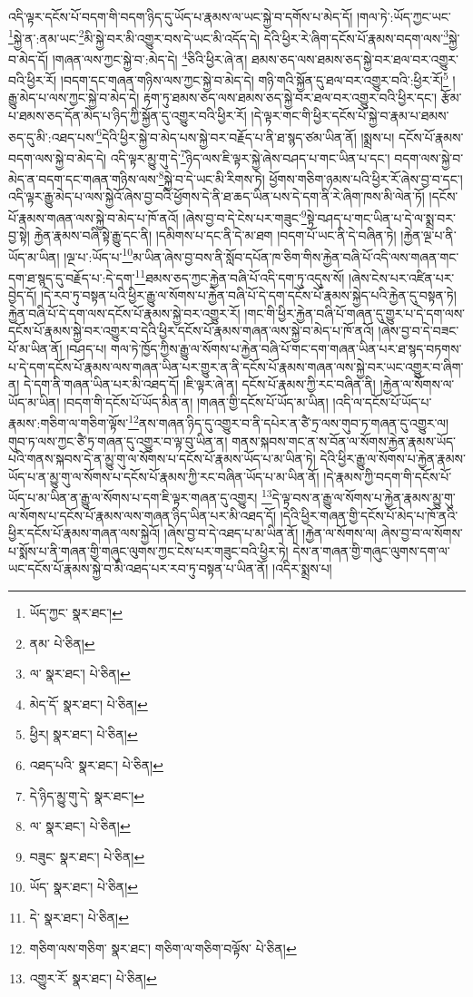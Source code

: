 འདི་ལྟར་དངོས་པོ་བདག་གི་བདག་ཉིད་དུ་ཡོད་པ་རྣམས་ལ་ཡང་སྐྱེ་བ་དགོས་པ་མེད་དོ། །གལ་ཏེ་:ཡོད་ཀྱང་ཡང་\footnote{ཡོད་ཀྱང་  སྣར་ཐང་། }སྐྱེ་ན་:ནམ་ཡང་\footnote{ནམ་  པེ་ཅིན། }མི་སྐྱེ་བར་མི་འགྱུར་བས་དེ་ཡང་མི་འདོད་དེ། དེའི་ཕྱིར་རེ་ཞིག་དངོས་པོ་རྣམས་བདག་ལས་\footnote{ལ་  སྣར་ཐང་།  པེ་ཅིན། }སྐྱེ་བ་མེད་དོ། །གཞན་ལས་ཀྱང་སྐྱེ་བ་:མེད་དེ། \footnote{མེད་དོ་  སྣར་ཐང་།  པེ་ཅིན། }ཅིའི་ཕྱིར་ཞེ་ན། ཐམས་ཅད་ལས་ཐམས་ཅད་སྐྱེ་བར་ཐལ་བར་འགྱུར་བའི་ཕྱིར་རོ། །བདག་དང་གཞན་གཉིས་ལས་ཀྱང་སྐྱེ་བ་མེད་དེ། གཉི་གའི་སྐྱོན་དུ་ཐལ་བར་འགྱུར་བའི་:ཕྱིར་རོ།\footnote{ཕྱིར།  སྣར་ཐང་།  པེ་ཅིན། } །རྒྱུ་མེད་པ་ལས་ཀྱང་སྐྱེ་བ་མེད་དེ། རྟག་ཏུ་ཐམས་ཅད་ལས་ཐམས་ཅད་སྐྱེ་བར་ཐལ་བར་འགྱུར་བའི་ཕྱིར་དང་། རྩོམ་པ་ཐམས་ཅད་དོན་མེད་པ་ཉིད་ཀྱི་སྐྱོན་དུ་འགྱུར་བའི་ཕྱིར་རོ། །དེ་ལྟར་གང་གི་ཕྱིར་དངོས་པོ་སྐྱེ་བ་རྣམ་པ་ཐམས་ཅད་དུ་མི་:འཐད་པས་\footnote{འཐད་པའི་  སྣར་ཐང་།  པེ་ཅིན། }དེའི་ཕྱིར་སྐྱེ་བ་མེད་པས་སྐྱེ་བར་བརྗོད་པ་ནི་ཐ་སྙད་ཙམ་ཡིན་ནོ། །སྨྲས་པ། དངོས་པོ་རྣམས་བདག་ལས་སྐྱེ་བ་མེད་དེ། འདི་ལྟར་མྱུ་གུ་དེ་\footnote{དེ་ཉིད་མྱུ་གུ་དེ་  སྣར་ཐང་། }ཉིད་ལས་ཇི་ལྟར་སྐྱེ་ཞེས་བཤད་པ་གང་ཡིན་པ་དང་། བདག་ལས་སྐྱེ་བ་མེད་ན་བདག་དང་གཞན་གཉིས་ལས་\footnote{ལ་  སྣར་ཐང་།  པེ་ཅིན། }སྐྱེ་བ་དེ་ཡང་མི་རིགས་ཏེ། ཕྱོགས་གཅིག་ཉམས་པའི་ཕྱིར་རོ་ཞེས་བྱ་བ་དང་། འདི་ལྟར་རྒྱུ་མེད་པ་ལས་སྐྱེའོ་ཞེས་བྱ་བའི་ཕྱོགས་དེ་ནི་ཐ་ཆད་ཡིན་པས་དེ་དག་ནི་རེ་ཞིག་ཁས་མི་ལེན་ཏོ། །དངོས་པོ་རྣམས་གཞན་ལས་སྐྱེ་བ་མེད་པ་ཁོ་ནའོ། །ཞེས་བྱ་བ་དེ་ངེས་པར་གཟུང་\footnote{བཟུང་  སྣར་ཐང་།  པེ་ཅིན། }སྟེ་བཤད་པ་གང་ཡིན་པ་དེ་ལ་སྨྲ་བར་བྱ་སྟེ། རྐྱེན་རྣམས་བཞི་སྟེ་རྒྱུ་དང་ནི། །དམིགས་པ་དང་ནི་དེ་མ་ཐག །བདག་པོ་ཡང་ནི་དེ་བཞིན་ཏེ། །རྐྱེན་ལྔ་པ་ནི་ཡོད་མ་ཡིན། །ལྔ་པ་:ཡོད་པ་\footnote{ཡོད་  སྣར་ཐང་།  པེ་ཅིན། }མ་ཡིན་ཞེས་བྱ་བས་ནི་སློབ་དཔོན་ཁ་ཅིག་གིས་རྐྱེན་བཞི་པོ་འདི་ལས་གཞན་གང་དག་ཐ་སྙད་དུ་བརྗོད་པ་:དེ་དག་\footnote{དེ་  སྣར་ཐང་།  པེ་ཅིན། }ཐམས་ཅད་ཀྱང་རྐྱེན་བཞི་པོ་འདི་དག་ཏུ་འདུས་སོ། །ཞེས་ངེས་པར་འཛིན་པར་བྱེད་དོ། །དེ་རབ་ཏུ་བསྟན་པའི་ཕྱིར་རྒྱུ་ལ་སོགས་པ་རྐྱེན་བཞི་པོ་དེ་དག་དངོས་པོ་རྣམས་སྐྱེད་པའི་རྐྱེན་དུ་བསྟན་ཏེ། རྐྱེན་བཞི་པོ་དེ་དག་ལས་དངོས་པོ་རྣམས་སྐྱེ་བར་འགྱུར་རོ། །གང་གི་ཕྱིར་རྐྱེན་བཞི་པོ་གཞན་དུ་གྱུར་པ་དེ་དག་ལས་དངོས་པོ་རྣམས་སྐྱེ་བར་འགྱུར་བ་དེའི་ཕྱིར་དངོས་པོ་རྣམས་གཞན་ལས་སྐྱེ་བ་མེད་པ་ཁོ་ནའོ། །ཞེས་བྱ་བ་དེ་བཟང་པོ་མ་ཡིན་ནོ། །བཤད་པ། གལ་ཏེ་ཁྱོད་ཀྱིས་རྒྱུ་ལ་སོགས་པ་རྐྱེན་བཞི་པོ་གང་དག་གཞན་ཡིན་པར་ཐ་སྙད་བཏགས་པ་དེ་དག་དངོས་པོ་རྣམས་ལས་གཞན་ཡིན་པར་གྱུར་ན་ནི་དངོས་པོ་རྣམས་གཞན་ལས་སྐྱེ་བར་ཡང་འགྱུར་བ་ཞིག་ན། དེ་དག་ནི་གཞན་ཡིན་པར་མི་འཐད་དོ། །ཇི་ལྟར་ཞེ་ན། དངོས་པོ་རྣམས་ཀྱི་རང་བཞིན་ནི། །རྐྱེན་ལ་སོགས་ལ་ཡོད་མ་ཡིན། །བདག་གི་དངོས་པོ་ཡོད་མིན་ན། །གཞན་གྱི་དངོས་པོ་ཡོད་མ་ཡིན། །འདི་ལ་དངོས་པོ་ཡོད་པ་རྣམས་:གཅིག་ལ་གཅིག་ལྟོས་\footnote{གཅིག་ལས་གཅིག་  སྣར་ཐང་། གཅིག་ལ་གཅིག་བལྟོས་  པེ་ཅིན། }ནས་གཞན་ཉིད་དུ་འགྱུར་བ་ནི་དཔེར་ན་ཙཻ་ཏྲ་ལས་གུབ་ཏ་གཞན་དུ་འགྱུར་ལ། གུབ་ཏ་ལས་ཀྱང་ཙཻ་ཏྲ་གཞན་དུ་འགྱུར་བ་ལྟ་བུ་ཡིན་ན། གནས་སྐབས་གང་ན་ས་བོན་ལ་སོགས་རྐྱེན་རྣམས་ཡོད་པའི་གནས་སྐབས་དེ་ན་མྱུ་གུ་ལ་སོགས་པ་དངོས་པོ་རྣམས་ཡོད་པ་མ་ཡིན་ཏེ། དེའི་ཕྱིར་རྒྱུ་ལ་སོགས་པ་རྐྱེན་རྣམས་ཡོད་པ་ན་མྱུ་གུ་ལ་སོགས་པ་དངོས་པོ་རྣམས་ཀྱི་རང་བཞིན་ཡོད་པ་མ་ཡིན་ནོ། །དེ་རྣམས་ཀྱི་བདག་གི་དངོས་པོ་ཡོད་པ་མ་ཡིན་ན་རྒྱུ་ལ་སོགས་པ་དག་ཇི་ལྟར་གཞན་དུ་འགྱུར། \footnote{འགྱུར་རོ་  སྣར་ཐང་།  པེ་ཅིན། }དེ་ལྟ་བས་ན་རྒྱུ་ལ་སོགས་པ་རྐྱེན་རྣམས་མྱུ་གུ་ལ་སོགས་པ་དངོས་པོ་རྣམས་ལས་གཞན་ཉིད་ཡིན་པར་མི་འཐད་དོ། །དེའི་ཕྱིར་གཞན་གྱི་དངོས་པོ་མེད་པ་ཁོ་ནའི་ཕྱིར་དངོས་པོ་རྣམས་གཞན་ལས་སྐྱེའོ། །ཞེས་བྱ་བ་དེ་འཐད་པ་མ་ཡིན་ནོ། །རྐྱེན་ལ་སོགས་ལ། ཞེས་བྱ་བ་ལ་སོགས་པ་སྨོས་པ་ནི་གཞན་གྱི་གཞུང་ལུགས་ཀྱང་ངེས་པར་གཟུང་བའི་ཕྱིར་ཏེ། དེས་ན་གཞན་གྱི་གཞུང་ལུགས་དག་ལ་ཡང་དངོས་པོ་རྣམས་སྐྱེ་བ་མི་འཐད་པར་རབ་ཏུ་བསྟན་པ་ཡིན་ནོ། །འདིར་སྨྲས་པ། 